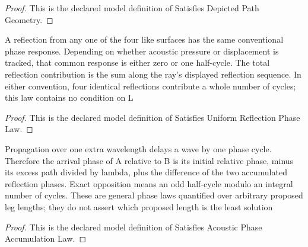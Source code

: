 \begin{proof}
  This is the declared model definition of Satisfies Depicted Path Geometry.
\end{proof}
\begin{definition}
  \label{def:physics:phyx-mini-0322:phyxminiproblems-problemphyxmini0322-satisfiesuniformreflectionphaselaw}
  A reflection from any one of the four like surfaces has the same conventional phase response. Depending on whether acoustic pressure or displacement is tracked, that common response is either zero or one half-cycle. The total reflection contribution is the sum along the ray's displayed reflection sequence. In either convention, four identical reflections contribute a whole number of cycles; this law contains no condition on L
\end{definition}
\begin{proof}
  This is the declared model definition of Satisfies Uniform Reflection Phase Law.
\end{proof}
\begin{definition}
  \label{def:physics:phyx-mini-0322:phyxminiproblems-problemphyxmini0322-satisfiesacousticphaseaccumulationlaw}
  Propagation over one extra wavelength delays a wave by one phase cycle. Therefore the arrival phase of A relative to B is its initial relative phase, minus its excess path divided by lambda, plus the difference of the two accumulated reflection phases. Exact opposition means an odd half-cycle modulo an integral number of cycles. These are general phase laws quantified over arbitrary proposed leg lengths; they do not assert which proposed length is the least solution
\end{definition}
\begin{proof}
  This is the declared model definition of Satisfies Acoustic Phase Accumulation Law.
\end{proof}
